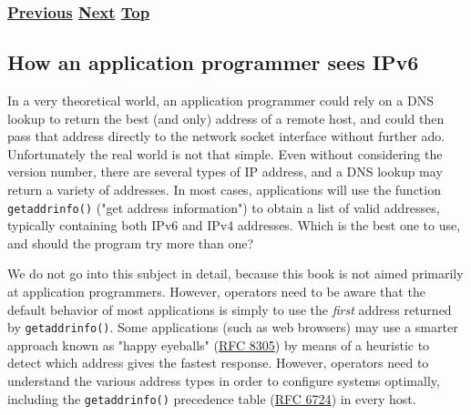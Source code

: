 \documentclass[
]{article}
\begin{document}
\subsubsection{\texorpdfstring{\hyperref[how-to-use-this-book]{Previous}
\hyperref[how-an-application-programmer-sees-ipv6]{Next}
\hyperref[introduction-and-foreword]{Top}}{Previous Next Top}}\label{previous-next-top-1}

\pagebreak

\subsection{How an application programmer sees
IPv6}\label{how-an-application-programmer-sees-ipv6}

In a very theoretical world, an application programmer could rely on a
DNS lookup to return the best (and only) address of a remote host, and
could then pass that address directly to the network socket interface
without further ado. Unfortunately the real world is not that simple.
Even without considering the version number, there are several types of
IP address, and a DNS lookup may return a variety of addresses. In most
cases, applications will use the function \texttt{getaddrinfo()} ("get
address information") to obtain a list of valid addresses, typically
containing both IPv6 and IPv4 addresses. Which is the best one to use,
and should the program try more than one?

We do not go into this subject in detail, because this book is not aimed
primarily at application programmers. However, operators need to be
aware that the default behavior of most applications is simply to use
the \emph{first} address returned by \texttt{getaddrinfo()}. Some
applications (such as web browsers) may use a smarter approach known as
"happy eyeballs" (\href{https://www.rfc-editor.org/info/rfc8305}{RFC
8305}) by means of a heuristic to detect which address gives the fastest
response. However, operators need to understand the various address
types in order to configure systems optimally, including the
\texttt{getaddrinfo()} precedence table
(\href{https://www.rfc-editor.org/info/rfc6724}{RFC 6724}) in every
host.
\end{document}
